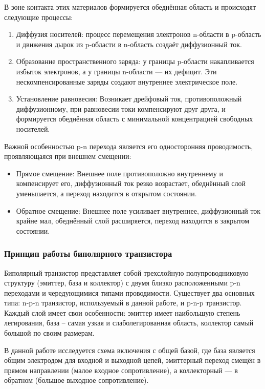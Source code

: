 В зоне контакта этих материалов формируется обеднённая область и происходят следующие процессы:
\begin{enumerate}
\item Диффузия носителей: процесс перемещения электронов n-области в p-область и движения дырок из p-области в n-область создаёт диффузионный ток.
\item Образование пространственного заряда: у границы p-области накапливается избыток электронов, а у границы n-области — их дефицит. Эти нескомпенсированные заряды создают внутреннее электрическое поле.
\item Установление равновесия: Возникает дрейфовый ток, противоположный диффузионному, при равновесии токи компенсируют друг друга, и формируется обеднённая область с минимальной концентрацией свободных носителей.
\end{enumerate}

Важной особенностью p-n перехода является его односторонняя проводимость, проявляющаяся при внешнем смещении:
\begin{itemize}
\item Прямое смещение: Внешнее поле противоположно внутреннему и компенсирует его, диффузионный ток резко возрастает, обеднённый слой уменьшается, а переход находится в открытом состоянии.
\item Обратное смещение: Внешнее поле усиливает внутреннее, диффузионный ток крайне мал, обеднённый слой расширяется, переход находится в закрытом состоянии.
\end{itemize}

\subsubsection{Принцип работы биполярного транзистора}

Биполярный транзистор представляет собой трехслойную полупроводниковую структуру (эмиттер, база и коллектор) с двумя близко расположенными p-n переходами и чередующимися типами проводимости. Существует два основных типа: n-p-n транзистор, используемый в данной работе, и p-n-p транзистор. Каждый слой имеет свои особенности: эмиттер имеет наибольшую степень легирования, база -- самая узкая и слаболегированная область, коллектор самый большой по своим размерам.

В данной работе исследуется схема включения с общей базой, где база является общим электродом для входной и выходной цепей, эмиттерный переход смещён в прямом направлении (малое входное сопротивление), а коллекторный — в обратном (большое выходное сопротивление).

